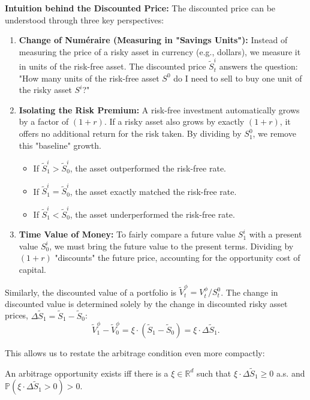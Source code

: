 \textbf{Intuition behind the Discounted Price:}
The discounted price can be understood through three key perspectives:
\begin{enumerate}
    \item \textbf{Change of Num\'eraire (Measuring in "Savings Units"):} Instead of measuring the price of a risky asset in currency (e.g., dollars), we measure it in units of the risk-free asset. The discounted price $\tilde{S}_t^i$ answers the question: "How many units of the risk-free asset $S^0$ do I need to sell to buy one unit of the risky asset $S^i$?"
    \item \textbf{Isolating the Risk Premium:} A risk-free investment automatically grows by a factor of $(1+r)$. If a risky asset also grows by exactly $(1+r)$, it offers no additional return for the risk taken. By dividing by $S_1^0$, we remove this "baseline" growth. 
    \begin{itemize}
        \item If $\tilde{S}_1^i > \tilde{S}_0^i$, the asset outperformed the risk-free rate.
        \item If $\tilde{S}_1^i = \tilde{S}_0^i$, the asset exactly matched the risk-free rate.
        \item If $\tilde{S}_1^i < \tilde{S}_0^i$, the asset underperformed the risk-free rate.
    \end{itemize}
    \item \textbf{Time Value of Money:} To fairly compare a future value $S_1^i$ with a present value $S_0^i$, we must bring the future value to the present terms. Dividing by $(1+r)$ "discounts" the future price, accounting for the opportunity cost of capital.
\end{enumerate}

Similarly, the discounted value of a portfolio is $\tilde{V}_t^\phi = V_t^\phi / S_t^0$.
The change in discounted value is determined solely by the change in discounted risky asset prices, $\Delta \tilde{S}_1 = \tilde{S}_1 - \tilde{S}_0$:
\begin{equation}
    \tilde{V}_1^\phi - \tilde{V}_0^\phi = \xi \cdot (\tilde{S}_1 - \tilde{S}_0) = \xi \cdot \Delta \tilde{S}_1.
\end{equation}

This allows us to restate the arbitrage condition even more compactly:
\begin{proposition}
An arbitrage opportunity exists iff there is a $\xi \in \mathbb{R}^d$ such that $\xi \cdot \Delta \tilde{S}_1 \ge 0$ a.s. and $\mathbb{P}(\xi \cdot \Delta \tilde{S}_1 > 0) > 0$.
\end{proposition}

